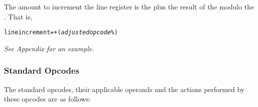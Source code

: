 The amount to increment the line register is the 
 plus
the result of the 
\textit{} modulo the 
. That
is,

\begin{alltt}
  line increment =  + (\textit{adjusted opcode} \% )
\end{alltt}

\textit{See Appendix  for an example.}


\subsubsection{Standard Opcodes}
\label{chap:standardopcodes}
The standard opcodes, their applicable operands and the
actions performed by these opcodes are as follows:

